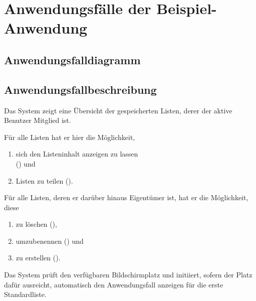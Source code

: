 
\chapter{Anwendungsfälle der Beispiel-Anwendung}


\pagebreak
{}
\section{Anwendungsfalldiagramm}


\restoregeometry
\pagebreak

\section{Anwendungsfallbeschreibung}

	\label{manageLists}

	\begin{description}
	
		
		\begin{verlauf}
		
		\item Das System zeigt eine Übersicht der gespeicherten Listen, derer der aktive Benutzer Mitglied ist.
		\item Für alle Listen hat er hier die Möglichkeit,
			\begin{enumerate}
			\item sich den Listeninhalt anzeigen zu lassen \\ () und 
			\item Listen zu teilen (). 
			\end{enumerate}
		\item Für alle Listen, deren er darüber hinaus Eigentümer ist, hat er die Möglichkeit, diese 
			\begin{enumerate}
			\item zu löschen (), 
			\item umzubenennen () und
			\item zu erstellen ().
			\end{enumerate}
		\item Das System prüft den verfügbaren Bildschirmplatz und initiiert, sofern der Platz dafür ausreicht, automatisch den Anwendungsfall  anzeigen für die erste Standardliste.
		\end{verlauf}
	
	\end{description}

